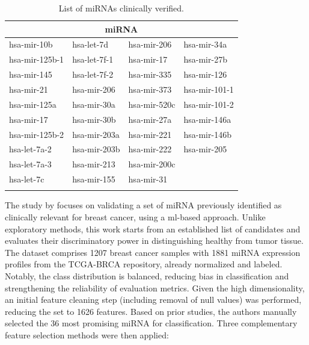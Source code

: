 \begin{table}[h!]
  \centering
  \caption{List of miRNAs clinically verified.}
  \begin{tabular}{llll}
    \toprule
    \multicolumn{4}{c}{\textbf{miRNA} \cite{clinically_important_mirnas}} \\
    \midrule
    hsa-mir-10b    & hsa-let-7d   & hsa-mir-206  & hsa-mir-34a            \\
    hsa-mir-125b-1 & hsa-let-7f-1 & hsa-mir-17   & hsa-mir-27b            \\
    hsa-mir-145    & hsa-let-7f-2 & hsa-mir-335  & hsa-mir-126            \\
    hsa-mir-21     & hsa-mir-206  & hsa-mir-373  & hsa-mir-101-1          \\
    hsa-mir-125a   & hsa-mir-30a  & hsa-mir-520c & hsa-mir-101-2          \\
    hsa-mir-17     & hsa-mir-30b  & hsa-mir-27a  & hsa-mir-146a           \\
    hsa-mir-125b-2 & hsa-mir-203a & hsa-mir-221  & hsa-mir-146b           \\
    hsa-let-7a-2   & hsa-mir-203b & hsa-mir-222  & hsa-mir-205            \\
    hsa-let-7a-3   & hsa-mir-213  & hsa-mir-200c &                        \\
    hsa-let-7c     & hsa-mir-155  & hsa-mir-31   &                        \\
    \bottomrule
    \label{tab:clinically_verified}
  \end{tabular}
\end{table}

The study by \textcite{val_of_mirna_as_biomarker_Rehman_2019} focuses on
validating a set of miRNA previously identified as clinically relevant
for breast cancer, using a \gls{ml}-based approach. Unlike exploratory methods, this
work starts from an established list of candidates and evaluates their
discriminatory power in distinguishing healthy from tumor tissue. The dataset
comprises 1207 breast cancer samples with 1881 miRNA expression profiles
from the TCGA-BRCA repository, already normalized and labeled. Notably, the
class distribution is balanced, reducing bias in classification and
strengthening the reliability of evaluation metrics. Given the high
dimensionality, an initial feature cleaning step (including removal of null
values) was performed, reducing the set to 1626 features. Based on prior
studies, the authors manually selected the 36 most promising miRNA for
classification. Three complementary feature selection methods were then
applied:

